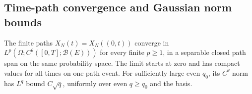 \subsection{Time-path convergence and Gaussian norm bounds}

\begin{lemma}\label{L:driver-holder-limit}
  The finite paths $X_N(t)=X_N((0,t))$ converge in
  $L^p(\Omega;C^\theta([0,T];\mathcal B(E)))$ for every finite $p\ge1$,
  in a separable closed path span on the same probability space. The limit
  starts at zero and has compact values for all times on one path event.
  For sufficiently large even $q_0$, its $C^\theta$ norm has
  $L^q$ bound $C\sqrt q$, uniformly over even $q\ge q_0$ and the basis.
\end{lemma}


